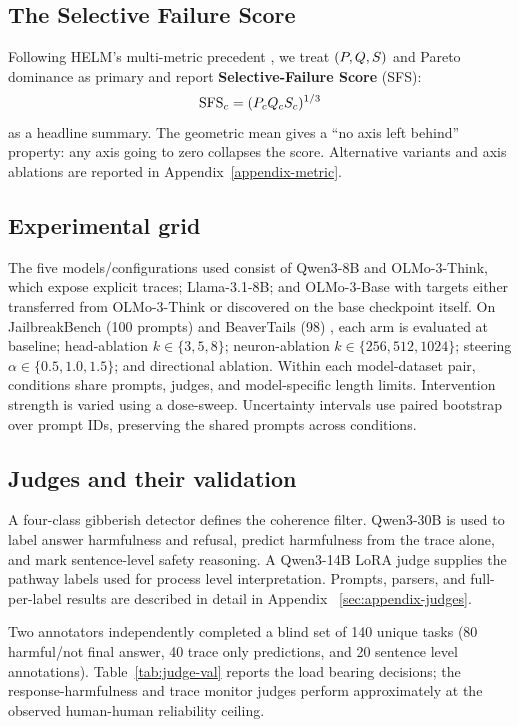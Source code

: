 \subsection{The Selective Failure Score}
\label{sec:composite}
Following  HELM's multi-metric precedent \citep{liang2023helm}, we treat $(P,Q,S)$ and Pareto dominance as primary and report
\textbf{Selective-Failure Score} (SFS):
\begin{equation}
  \mathrm{SFS}_c=(P_cQ_cS_c)^{1/3}
  \label{eq:sfs}
\end{equation}
as a headline summary. The geometric mean gives a ``no axis left behind'' property: any axis going to zero collapses the score. Alternative variants and axis ablations are reported in Appendix~\ref{appendix-metric}. 

\subsection{Experimental grid}
\label{sec:grid}
The five models/configurations used consist of Qwen3-8B and OLMo-3-Think, which expose explicit traces; Llama-3.1-8B; and OLMo-3-Base with targets either
transferred from OLMo-3-Think or discovered on the base checkpoint itself. On JailbreakBench (100 prompts) \citep{chao2024jailbreakbench} and BeaverTails (98)
\citep{ji2023beavertails}, each arm is evaluated at baseline; head-ablation $k\in\{3,5,8\}$; neuron-ablation $k\in\{256,512,1024\}$; steering $\alpha\in\{0.5,1.0,1.5\}$; and directional ablation. Within each model-dataset pair, conditions share prompts, judges, and model-specific length limits. Intervention strength is varied using a dose-sweep. Uncertainty intervals use paired bootstrap over prompt IDs, preserving the shared prompts across conditions.


\subsection{Judges and their validation}
\label{sec:judges}
A four-class gibberish detector defines the coherence filter. Qwen3-30B is used to label answer harmfulness and refusal, predict harmfulness from the trace alone, and mark sentence-level safety reasoning. A Qwen3-14B LoRA judge supplies the pathway labels used for process level interpretation. Prompts, parsers, and full-per-label results are described in detail in Appendix ~\ref{sec:appendix-judges}. 

Two annotators independently completed a blind set of 140 unique tasks (80 harmful/not final answer, 40 trace only predictions, and 20 sentence level annotations). Table~\ref{tab:judge-val} reports the load bearing decisions; the response-harmfulness and trace monitor judges perform approximately at the observed human-human reliability ceiling.  

